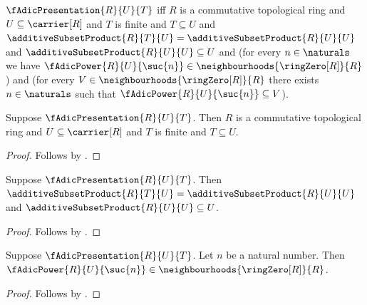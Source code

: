 \begin{definition}\label{f_adic_presentation}
    $\fAdicPresentation{R}{U}{T}$ iff
        $R$ is a commutative topological ring and
        $U\subseteq\carrier[R]$ and $T$ is finite and $T\subseteq U$ and
        $\additiveSubsetProduct{R}{T}{U}
            =\additiveSubsetProduct{R}{U}{U}$ and
        $\additiveSubsetProduct{R}{U}{U}\subseteq U$ and
        (for every $n\in\naturals$ we have
            $\fAdicPower{R}{U}{\suc{n}}
                \in\neighbourhoods{\ringZero[R]}{R}$) and
        (for every $V\in\neighbourhoods{\ringZero[R]}{R}$ there exists
            $n\in\naturals$ such that
                $\fAdicPower{R}{U}{\suc{n}}\subseteq V$).
\end{definition}

\begin{proposition}\label{f_adic_presentation_ambient}
    Suppose $\fAdicPresentation{R}{U}{T}$.
    Then $R$ is a commutative topological ring and
        $U\subseteq\carrier[R]$ and $T$ is finite and $T\subseteq U$.
\end{proposition}
\begin{proof}
    Follows by .
\end{proof}

\begin{proposition}\label{f_adic_presentation_contraction}
    Suppose $\fAdicPresentation{R}{U}{T}$.
    Then $\additiveSubsetProduct{R}{T}{U}
            =\additiveSubsetProduct{R}{U}{U}$ and
        $\additiveSubsetProduct{R}{U}{U}\subseteq U$.
\end{proposition}
\begin{proof}
    Follows by .
\end{proof}

\begin{proposition}\label{f_adic_presentation_power_neighbourhood}
    Suppose $\fAdicPresentation{R}{U}{T}$.
    Let $n$ be a natural number.
    Then $\fAdicPower{R}{U}{\suc{n}}
        \in\neighbourhoods{\ringZero[R]}{R}$.
\end{proposition}
\begin{proof}
    Follows by .
\end{proof}

